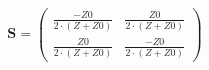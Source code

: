 \begin{equation} \mathbf{S} = \left(\begin{array}{cc}
\frac{-Z0}{2\cdot \left(Z+Z0\right)} & \frac{Z0}{2\cdot
\left(Z+Z0\right)} \\ \frac{Z0}{2\cdot \left(Z+Z0\right)} &
\frac{-Z0}{2\cdot \left(Z+Z0\right)} \end{array}\right) \end{equation}
